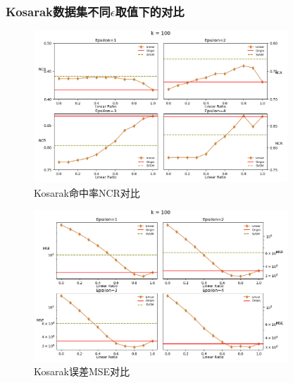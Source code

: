\documentclass[UTF8,a4paper]{ctexart}
\begin{document}
\newpage
\subsubsection{Kosarak数据集不同$\epsilon$取值下的对比}

  \begin{figure}[htbp]
    \centering
    \includegraphics[width=0.85\textwidth]{kosarak_linear_ncr}
    \caption{Kosarak命中率NCR对比}
    \label{fig:kosarak_linear_ncr}
  \end{figure}

  \begin{figure}[htbp]
    \centering
    \includegraphics[width=0.85\textwidth]{kosarak_linear_mse}
    \caption{Kosarak误差MSE对比}
    \label{fig:kosarak_linear_mse}
  \end{figure}



\end{document}
